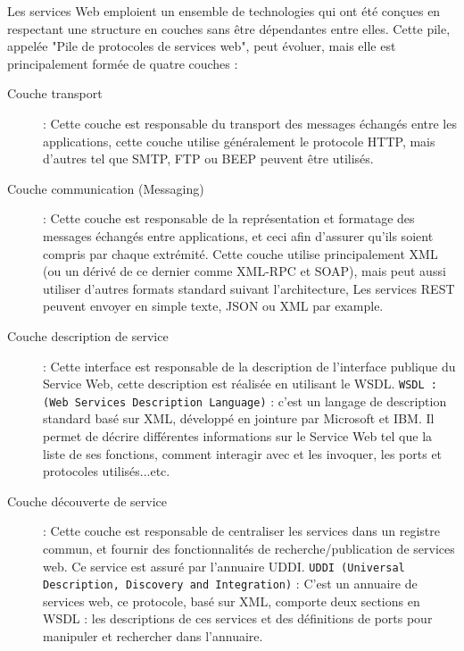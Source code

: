 Les services Web emploient un ensemble de technologies qui ont été conçues en respectant une structure en couches sans être dépendantes entre elles. Cette pile, appelée "Pile de protocoles de services web", peut évoluer, mais elle est principalement formée de quatre couches : \cite{refTutorialPointsWS}
\begin{description}
	\item[Couche transport] : Cette couche est responsable du transport des messages échangés entre les applications, cette couche utilise généralement le protocole HTTP, mais d'autres tel que SMTP, FTP ou BEEP peuvent être utilisés.
	\item [Couche communication (Messaging)] : Cette couche est responsable de la représentation et formatage des messages échangés entre applications, et ceci afin d'assurer qu'ils soient compris par chaque extrémité. Cette couche utilise principalement XML (ou un dérivé de ce dernier comme XML-RPC et SOAP), mais peut aussi utiliser d'autres formats standard suivant l'architecture, Les services REST peuvent envoyer en simple texte, JSON ou XML par example.
	\item[Couche description de service] : Cette interface est responsable de la description de l'interface publique du Service Web, cette description est réalisée en utilisant le WSDL.\newline
	      \texttt{WSDL : (Web Services Description Language)} : c'est un langage de description standard basé sur XML, développé en jointure par Microsoft et IBM. Il permet de décrire différentes informations sur le Service Web tel que la liste de ses fonctions, comment interagir avec et les invoquer, les ports et protocoles utilisés...etc.
	\item[Couche découverte de service] : Cette couche est responsable de centraliser les services dans un registre commun, et fournir des fonctionnalités de recherche/publication de services web. Ce service est assuré par l'annuaire UDDI.\newline
	      \texttt{UDDI (Universal Description, Discovery and Integration)} : C'est un annuaire de services web, ce protocole, basé sur XML, comporte deux sections en WSDL : les descriptions de ces services et des définitions de ports pour manipuler et rechercher dans l'annuaire.
\end{description}
			
